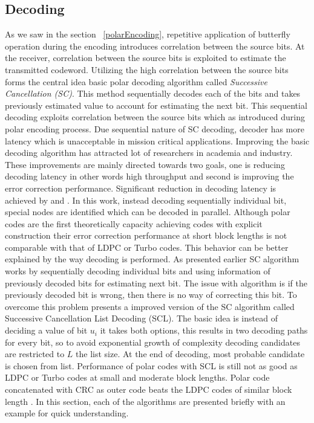 \subsection{Decoding}
As we saw in the section ~\ref{polarEncoding}, repetitive application of butterfly operation during the encoding introduces correlation between the source bits. At the receiver, correlation between the source bits is exploited to estimate the transmitted codeword. Utilizing the high correlation between the source bits forms the central idea basic polar decoding algorithm called \emph{Successive Cancellation (SC)}. This method sequentially decodes each of the bits and takes previously estimated value to account for estimating the next bit. This sequential decoding exploits correlation between the source bits which as introduced during polar encoding process. Due sequential nature of SC decoding, decoder has more latency which is unacceptable in mission critical applications. Improving the basic decoding algorithm has attracted lot of researchers in academia and industry. These improvements are mainly directed towards two goals, one is reducing decoding latency in other words high throughput and second is improving the error correction performance. Significant reduction in decoding latency is achieved by \cite{SSC} and \cite{fastSSC}. In this work, instead decoding sequentially individual bit, special nodes are identified which can be decoded in parallel. Although polar codes are the first theoretically capacity achieving codes with explicit construction their error correction performance at short block lengths is not comparable with that of LDPC or Turbo codes. This behavior can be better explained by the way decoding is performed. As presented earlier SC algorithm works by sequentially decoding individual bits and using information of previously decoded bits for estimating next bit. The issue with algorithm is if the previously decoded bit is wrong, then there is no way of correcting this bit.
To overcome this problem \cite{SCL} presents a improved version of the SC algorithm called Successive Cancellation List Decoding (SCL). The basic idea is instead of deciding a value of bit $u_{i}$ it takes both options, this results in two decoding paths for every bit, so to avoid exponential growth of complexity decoding candidates are restricted to $L$ the list size. At the end of decoding, most probable candidate is chosen from list. Performance of polar codes with SCL is still not as good as LDPC or Turbo codes at small and moderate block lengths. Polar code concatenated with CRC as outer code beats the LDPC codes of similar block length \cite{SCL}. In this section, each of the algorithms are presented briefly with an example for quick understanding.

